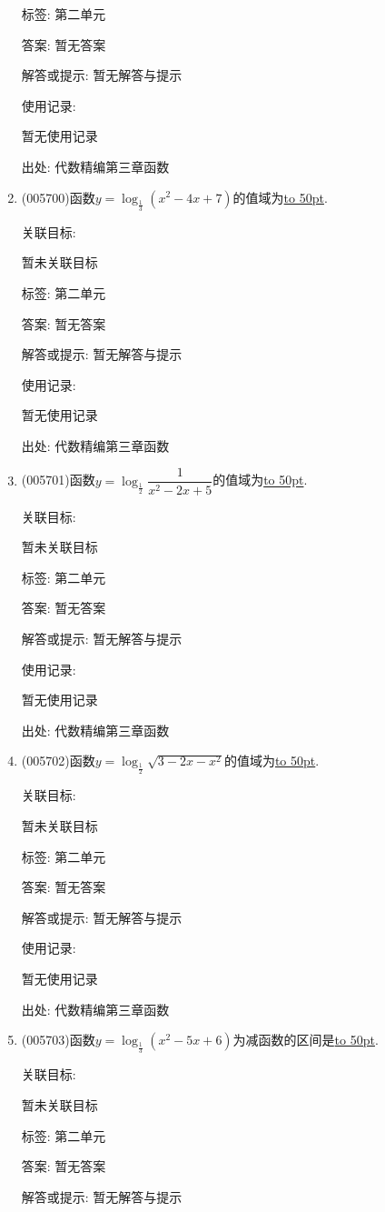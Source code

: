 \documentclass[10pt,a4paper]{article}
\newcommand{\blank}[1]{\underline{\hbox to #1pt{}}}
\begin{document}
\begin{enumerate}[1.]
标签: 第二单元

答案: 暂无答案

解答或提示: 暂无解答与提示

使用记录:

暂无使用记录


出处: 代数精编第三章函数
\item { (005700)}函数$y=\log_{\frac 13}(x^2-4x+7)$的值域为\blank{50}.


关联目标:

暂未关联目标



标签: 第二单元

答案: 暂无答案

解答或提示: 暂无解答与提示

使用记录:

暂无使用记录


出处: 代数精编第三章函数
\item { (005701)}函数$y=\log_{\frac 12}\dfrac 1{x^2-2x+5}$的值域为\blank{50}.


关联目标:

暂未关联目标



标签: 第二单元

答案: 暂无答案

解答或提示: 暂无解答与提示

使用记录:

暂无使用记录


出处: 代数精编第三章函数
\item { (005702)}函数$y=\log_{\frac 12}\sqrt {3-2x-x^2}$的值域为\blank{50}.


关联目标:

暂未关联目标



标签: 第二单元

答案: 暂无答案

解答或提示: 暂无解答与提示

使用记录:

暂无使用记录


出处: 代数精编第三章函数
\item { (005703)}函数$y=\log_{\frac 13}(x^2-5x+6)$为减函数的区间是\blank{50}.


关联目标:

暂未关联目标



标签: 第二单元

答案: 暂无答案

解答或提示: 暂无解答与提示


\end{enumerate}
\end{document}
